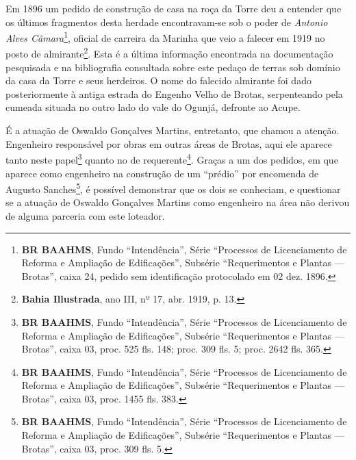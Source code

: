 Em 1896 um pedido de construção de casa na roça da Torre deu a entender que os últimos fragmentos desta herdade encontravam-se sob o poder de \textit{Antonio Alves Câmara}\footnote{\textbf{BR BAAHMS}, Fundo ``Intendência'', Série ``Processos de Licenciamento de Reforma e Ampliação de Edificações'', Subsérie ``Requerimentos e Plantas --- Brotas'', caixa 24, pedido sem identificação protocolado em 02 dez. 1896.}, oficial de carreira da Marinha que veio a falecer em 1919 no posto de almirante\footnote{\textbf{Bahia Illustrada}, ano III, nº 17, abr. 1919, p. 13.}. Esta é a última informação encontrada na documentação pesquisada e na bibliografia consultada sobre este pedaço de terras sob domínio da casa da Torre e seus herdeiros. O nome do falecido almirante foi dado posteriormente à antiga estrada do Engenho Velho de Brotas, serpenteando pela cumeada situada no outro lado do vale do Ogunjá, defronte ao Acupe.

É a atuação de Oswaldo Gonçalves Martins, entretanto, que chamou a atenção. Engenheiro responsável por obras em outras áreas de Brotas, aqui ele aparece tanto neste papel\footnote{\textbf{BR BAAHMS}, Fundo ``Intendência'', Série ``Processos de Licenciamento de Reforma e Ampliação de Edificações'', Subsérie ``Requerimentos e Plantas --- Brotas'', caixa 03, proc. 525 fls. 148; proc. 309 fls. 5; proc. 2642 fls. 365.} quanto no de requerente\footnote{\textbf{BR BAAHMS}, Fundo ``Intendência'', Série ``Processos de Licenciamento de Reforma e Ampliação de Edificações'', Subsérie ``Requerimentos e Plantas --- Brotas'', caixa 03, proc. 1455 fls. 383.}. Graças a um dos pedidos, em que aparece como engenheiro na construção de um ``prédio'' por encomenda de Augusto Sanches\footnote{\textbf{BR BAAHMS}, Fundo ``Intendência'', Série ``Processos de Licenciamento de Reforma e Ampliação de Edificações'', Subsérie ``Requerimentos e Plantas --- Brotas'', caixa 03, proc. 309 fls. 5.}, é possível demonstrar que os dois se conheciam, e questionar se a atuação de Oswaldo Gonçalves Martins como engenheiro na área não derivou de alguma parceria com este loteador.

